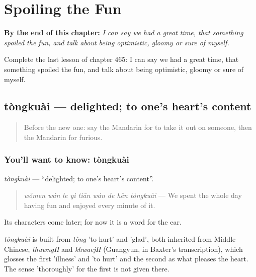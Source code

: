 
\chapter{Spoiling the Fun}
\label{ch:zh-spoiling-the-fun}

\begin{chapteropening}
\textbf{By the end of this chapter:} \emph{I can say we had a great time, that something spoiled the fun, and talk about being optimistic, gloomy or sure of myself.}

Complete the last lesson of chapter 465: I can say we had a great time, that something spoiled the fun, and talk about being optimistic, gloomy or sure of myself.
\end{chapteropening}

\section[tòngkuài]{tòngkuài — delighted; to one's heart's content}

\label{lesson:ZH-C465-tongkuai}



\begin{quote}
Before the new one: say the Mandarin for to take it out on someone, then the Mandarin for furious.
\end{quote}

\subsection*{You'll want to know: tòngkuài}
\emph{tòngkuài} — \textquotedblleft{}delighted; to one's heart's content\textquotedblright{}.

\begin{quote}
\emph{wǒmen wán le yì tiān wán de hěn tòngkuài} — We spent the whole day having fun and enjoyed every minute of it.
\end{quote}

Its characters come later; for now it is a word for the ear.

\begin{cousinweb}
\emph{tòngkuài} is built from \emph{tòng} 'to hurt' and  'glad', both inherited from Middle Chinese, \emph{thuwngH} and \emph{khwaejH} (Guangyun, in Baxter's transcription), which glosses the first 'illness' and 'to hurt' and the second as what pleases the heart. The sense 'thoroughly' for the first is not given there.
\end{cousinweb}

